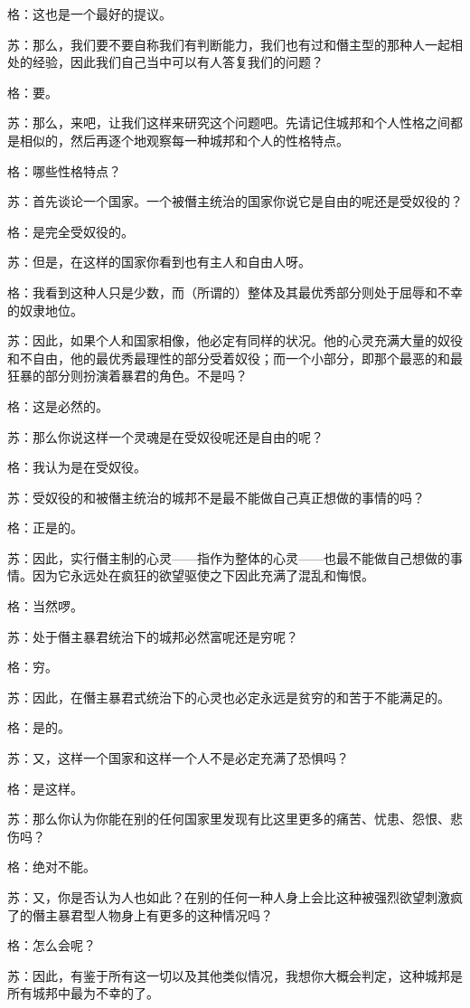 \documentclass[12pt,oneside]{book}
\begin{document}
格：这也是一个最好的提议。

苏：那么，我们要不要自称我们有判断能力，我们也有过和僭主型的那种人一起相处的经验，因此我们自己当中可以有人答复我们的问题？

格：要。

苏：那么，来吧，让我们这样来研究这个问题吧。先请记住城邦和个人性格之间都是相似的，然后再逐个地观察每一种城邦和个人的性格特点。

格：哪些性格特点？

苏：首先谈论一个国家。一个被僭主统治的国家你说它是自由的呢还是受奴役的？

格：是完全受奴役的。

苏：但是，在这样的国家你看到也有主人和自由人呀。

格：我看到这种人只是少数，而（所谓的）整体及其最优秀部分则处于屈辱和不幸的奴隶地位。

苏：因此，如果个人和国家相像，他必定有同样的状况。他的心灵充满大量的奴役和不自由，他的最优秀最理性的部分受着奴役；而一个小部分，即那个最恶的和最狂暴的部分则扮演着暴君的角色。不是吗？

格：这是必然的。

苏：那么你说这样一个灵魂是在受奴役呢还是自由的呢？

格：我认为是在受奴役。

苏：受奴役的和被僭主统治的城邦不是最不能做自己真正想做的事情的吗？

格：正是的。

苏：因此，实行僭主制的心灵——指作为整体的心灵——也最不能做自己想做的事情。因为它永远处在疯狂的欲望驱使之下因此充满了混乱和悔恨。

格：当然啰。

苏：处于僭主暴君统治下的城邦必然富呢还是穷呢？

格：穷。

苏：因此，在僭主暴君式统治下的心灵也必定永远是贫穷的和苦于不能满足的。

格：是的。

苏：又，这样一个国家和这样一个人不是必定充满了恐惧吗？

格：是这样。

苏：那么你认为你能在别的任何国家里发现有比这里更多的痛苦、忧患、怨恨、悲伤吗？

格：绝对不能。

苏：又，你是否认为人也如此？在别的任何一种人身上会比这种被强烈欲望刺激疯了的僭主暴君型人物身上有更多的这种情况吗？

格：怎么会呢？

苏：因此，有鉴于所有这一切以及其他类似情况，我想你大概会判定，这种城邦是所有城邦中最为不幸的了。
\end{document}

